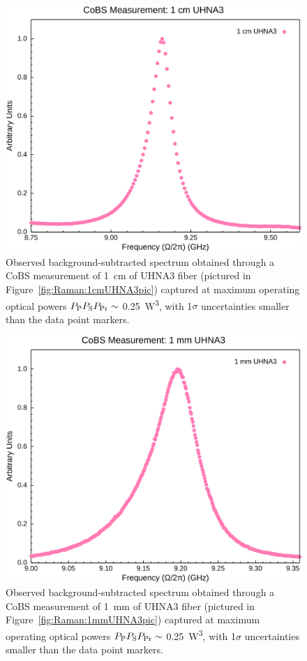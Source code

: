 \begin{figure}[t]
  \centering
  \hspace{-2em}\includegraphics[width=.85\textwidth]{figs/4-Raman/CoBS Measurement: 1 cm UHNA3.png}
  \caption{Observed background-subtracted spectrum obtained through a \ac{CoBS} measurement of \SI{1}{\centi\meter} of \ac{UHNA3} fiber (pictured in Figure~\ref{fig:Raman:1cmUHNA3pic}) captured at maximum operating optical powers \(P_{\rm P}P_{\rm S}P_{\rm Pr} \sim\) \SI{0.25}{\cubic\watt}, with 1\(\sigma\) uncertainties smaller than the data point markers.}
  \label{fig:Raman:1cmUHNA3}
\end{figure}

\begin{figure}[t]
  \centering
  \hspace{-2em}\includegraphics[width=.85\textwidth]{figs/4-Raman/CoBS Measurement: 1 mm UHNA3.png}
  \caption{Observed background-subtracted spectrum obtained through a \ac{CoBS} measurement of \SI{1}{\milli\meter} of \ac{UHNA3} fiber (pictured in Figure~\ref{fig:Raman:1mmUHNA3pic}) captured at maximum operating optical powers \(P_{\rm P}P_{\rm S}P_{\rm Pr} \sim\) \SI{0.25}{\cubic\watt}, with 1\(\sigma\) uncertainties smaller than the data point markers.}
  \label{fig:Raman:1mmUHNA3}
\end{figure}


